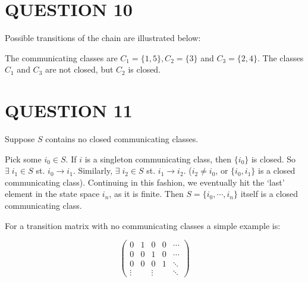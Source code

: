 \documentclass[a4paper]{article}
\begin{document}
\section{QUESTION 10}

Possible transitions of the chain are illustrated below:
  \begin{center}
\end{center}

The communicating classes are $ C_{1} = \{ 1,5 \}, C_{2} = \{ 3 \} $ and $ C_{3} = \{ 2,4 \} $. The classes $ C_{1} $ and $ C_{3} $ are not closed, but $ C_{2} $ is closed.

\section{QUESTION 11}

Suppose $ S $ contains no closed communicating classes. 

Pick some $ i_{0} \in S $. If $ i $ is a singleton communicating class, then $ \{i_{0} \} $ is closed. So $ \exists \; i_{1} \in S $ st. $ i_{0} \to i_{1} $. Similarly, $ \exists \; i_{2} \in S $ st. $ i_{1} \to i_{2} $. ($ i_{2} \neq i_{0} $, or $ \{i_{0},i_{1}\} $ is a closed communicating class). Continuing in this fashion, we eventually hit the `last' element in the state space $ i_{n} $, as it is finite. Then $ S = \{ i_{0},\cdots,i_{n} \} $ itself is a closed communicating class.

For a transition matrix with no communicating classes a simple example is:

\[ \begin{pmatrix}
0 & 1 & 0 & 0 &\cdots \\
0 & 0 & 1 & 0 & \cdots \\
0 & 0 & 0 & 1 & \ddots \\
\vdots &&\vdots && \ddots 
\end{pmatrix} \]
\end{document}
